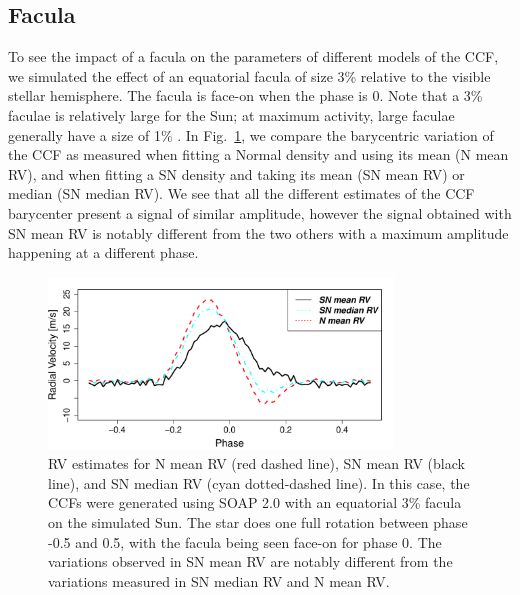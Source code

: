 \documentclass{aa}
\newcommand{\jessi}[1]{{\color{Purple}[[\textbf{Jessi: }#1]]}}
\begin{document}
\subsection{Facula} \label{sec:soap.faculae}

To see the impact of a facula on the parameters of different models of the CCF, we simulated the effect of an equatorial facula
of size 3\% relative to the visible stellar hemisphere. The facula is face-on when the phase is 0. 
Note that a 3\% faculae is relatively large for the Sun; at maximum activity, large faculae generally have a size of 1\% \citep[e.g.][]{Borgniet-2015}. 
In Fig.~\ref{fig:faculae}, we compare the barycentric variation of the CCF as measured when fitting a Normal density and using its mean (N mean RV), and when fitting a SN density and taking its mean (SN mean RV) or median (SN median RV). We see that all the different estimates of the CCF barycenter present a signal of similar amplitude, however the signal obtained with SN mean RV is notably different from the two others with a maximum amplitude happening at a different phase.

\begin{figure}[htbp]
\begin{center}
\includegraphics[width=3.6in]{RV_comparison_FACULA_withNoise.pdf} 
\caption{RV estimates for N mean RV (red dashed line),  SN mean RV (black line), and SN median RV (cyan dotted-dashed line). In this case, the CCFs were generated using SOAP 2.0 with an equatorial 3\% facula on the simulated Sun. The star does one full rotation between phase -0.5 and 0.5, with the facula being seen face-on for phase $0$. The variations observed in SN mean RV are notably different from the variations measured in SN median RV and N mean RV.  
}
    \label{fig:faculae}
\end{center}
\end{figure}
\end{document}
